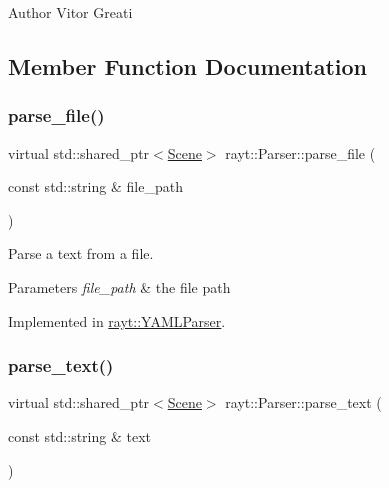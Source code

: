 \begin{DoxyAuthor}{Author}
Vitor Greati 
\end{DoxyAuthor}


\subsection{Member Function Documentation}
\mbox{\label{classrayt_1_1_parser_aa8ccda646d36c2c33013535947593def}} 
\subsubsection{\texorpdfstring{parse\_file()}{parse\_file()}}
{\footnotesize\ttfamily virtual std\+::shared\+\_\+ptr$<$\mbox{\hyperlink{classrayt_1_1_scene}{Scene}}$>$ rayt\+::\+Parser\+::parse\+\_\+file (\begin{DoxyParamCaption}\item[{const std\+::string \&}]{file\+\_\+path }\end{DoxyParamCaption})\hspace{0.3cm}{\ttfamily [pure virtual]}}



Parse a text from a file. 


\begin{DoxyParams}{Parameters}
{\em file\+\_\+path} & the file path \\
\hline
\end{DoxyParams}


Implemented in \mbox{\hyperlink{classrayt_1_1_y_a_m_l_parser_ab569d1029cec7dc2cb91eb0e08f5bc37}{rayt\+::\+Y\+A\+M\+L\+Parser}}.

\mbox{\label{classrayt_1_1_parser_a70296f0148b00574553a519156806fef}} 
\subsubsection{\texorpdfstring{parse\_text()}{parse\_text()}}
{\footnotesize\ttfamily virtual std\+::shared\+\_\+ptr$<$\mbox{\hyperlink{classrayt_1_1_scene}{Scene}}$>$ rayt\+::\+Parser\+::parse\+\_\+text (\begin{DoxyParamCaption}\item[{const std\+::string \&}]{text }\end{DoxyParamCaption})\hspace{0.3cm}{\ttfamily [pure virtual]}}



